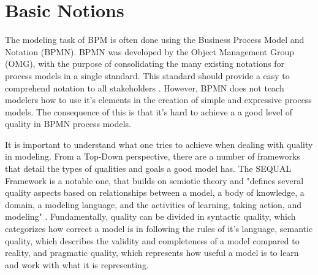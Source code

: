 \documentclass{llncs}
\begin{document}
\section{Basic Notions}\label{Fundamentals}\label{Background}

The modeling task of BPM is often done using the Business Process Model and Notation (BPMN). BPMN was developed by the Object Management Group (OMG), with the purpose of consolidating the many existing notations for process models in a single standard. This standard should provide a easy to comprehend notation to all stakeholders \cite{OMGObjectManagementGroup2015}. However, BPMN does not teach modelers how to use it's elements in the creation of simple and expressive process models. %
The consequence of this is that it's hard to achieve a a good level of quality in BPMN process models.




It is important to understand what one tries to achieve when dealing with quality in modeling. From a Top-Down perspective, there are a number of frameworks that detail the types of qualities and goals a good model has. The SEQUAL Framework \cite{Krogstie2006,Lindland1994} is a notable one, that builds on semiotic theory and "defines several quality aspects based on relationships between a model, a body of knowledge, a domain, a modeling language, and the activities of learning, taking action, and modeling" \cite{Mendling2007}. Fundamentally, quality can be divided in syntactic quality, which categorizes how correct a model is in following the rules of it's language, semantic quality, which describes the validity and completeness of a model compared to reality, and pragmatic quality, which represents how useful a model is to learn and work with what it is representing.
\end{document}
